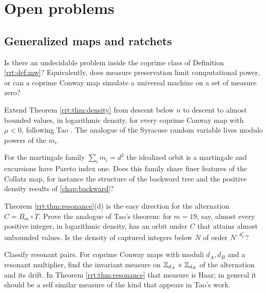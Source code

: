 \section{Open problems}

\subsection{Generalized maps and ratchets}
\begin{problem*}\label{rrt:op:undecidable}
Is there an undecidable problem inside the coprime class of Definition \ref{rrt:def:mw}? Equivalently, does measure preservation limit computational power, or can a coprime Conway map simulate a universal machine on a set of measure zero?
\end{problem*}

\begin{problem*}\label{rrt:prob:r2}
Extend Theorem \ref{rrt:thm:density} from descent below $n$ to descent to almost bounded values, in logarithmic density, for every coprime Conway map with $\mu<0$, following Tao \cite{tao2022}. The analogue of the Syracuse random variable lives modulo powers of the $m_i$.
\end{problem*}

\begin{problem*}\label{rrt:prob:r3}
For the martingale family $\sum_i m_i=d^2$ the idealized orbit is a martingale and excursions have Pareto index one. Does this family share finer features of the Collatz map, for instance the structure of the backward tree and the positive density results of \cref{chap:backward}?
\end{problem*}

\begin{problem*}\label{rrt:prob:r4}
Theorem \ref{rrt:thm:resonance}(d) is the easy direction for the alternation $C=B_m\circ T$. Prove the analogue of Tao's theorem: for $m=19$, say, almost every positive integer, in logarithmic density, has an orbit under $C$ that attains almost unbounded values. Is the density of captured integers below $N$ of order $N^{-\theta^*_C}$?
\end{problem*}

\begin{problem*}\label{rrt:prob:r5}
Classify resonant pairs. For coprime Conway maps with moduli $d_A,d_B$ and a resonant multiplier, find the invariant measure on $\mathbb{Z}_{d_A}\times\mathbb{Z}_{d_B}$ of the alternation and its drift. In Theorem \ref{rrt:thm:resonance} that measure is Haar; in general it should be a self similar measure of the kind that appears in Tao's work.
\end{problem*}


